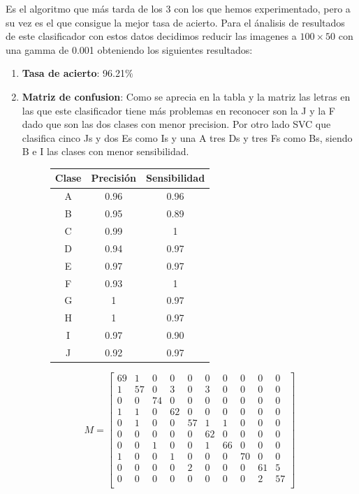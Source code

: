 \documentclass[8pt,a4paper]{{esannV2}}
\begin{document}
Es el algoritmo que más tarda de los 3 con los que hemos experimentado, pero a su vez es el que consigue la mejor tasa de acierto. Para el ánalisis de resultados de este clasificador con estos datos decidimos reducir las imagenes a $100\times50$ con una gamma de 0.001 obteniendo los siguientes resultados:
\begin{enumerate}
\item \textbf{Tasa de acierto}: 96.21$\%$
\item \textbf{Matriz de confusion}:
Como se aprecia en la tabla y la matriz las letras en las que este clasificador tiene más problemas en reconocer son la J y la F dado que son las dos clases con menor precision. Por otro lado SVC que clasifica cinco Js y dos Es como Is y una A tres Ds y tres Fs como Bs, siendo B e I las clases con menor sensibilidad.
\begin{figure}[h!]
\centering
\begin{minipage}{.5\textwidth}
    \begin{tabular}{|c|c|c|} %
    \hline
      \textbf{Clase} & \textbf{Precisión} & \textbf{Sensibilidad}\\
      \hline
      A & 0.96 & 0.96\\
      \hline
      B & 0.95 & 0.89\\
      \hline
      C & 0.99 & 1\\
      \hline
      D & 0.94 & 0.97\\
      \hline
      E & 0.97 & 0.97\\
      \hline
      F & 0.93 & 1\\
      \hline
      G & 1    & 0.97\\
      \hline
      H & 1    & 0.97\\
      \hline
      I & 0.97 & 0.90\\
      \hline
      J & 0.92 & 0.97\\
      \hline
    \end{tabular}
\end{minipage}%
\begin{minipage}{.5\textwidth}
\[
M=
  \begin{bmatrix}
    69 & 1 & 0 & 0 & 0 & 0 & 0 & 0 & 0 & 0 \\
    1 & 57 & 0 & 3 & 0 & 3 & 0 & 0 & 0 & 0 \\
    0 & 0 & 74 & 0 & 0 & 0 & 0 & 0 & 0 & 0 \\
    1 & 1 & 0 & 62 & 0 & 0 & 0 & 0 & 0 & 0 \\
    0 & 1 & 0 & 0 & 57 & 1 & 1 & 0 & 0 & 0 \\
    0 & 0 & 0 & 0 & 0 & 62 & 0 & 0 & 0 & 0 \\
    0 & 0 & 1 & 0 & 0 & 1 & 66 & 0 & 0 & 0 \\
    1 & 0 & 0 & 1 & 0 & 0 & 0 & 70 & 0 & 0 \\
    0 & 0 & 0 & 0 & 2 & 0 & 0 & 0 & 61 & 5 \\
    0 & 0 & 0 & 0 & 0 & 0 & 0 & 0 & 2 & 57 \\
  \end{bmatrix}
\]
\end{minipage}
\end{figure}



\end{enumerate}
\end{document}
